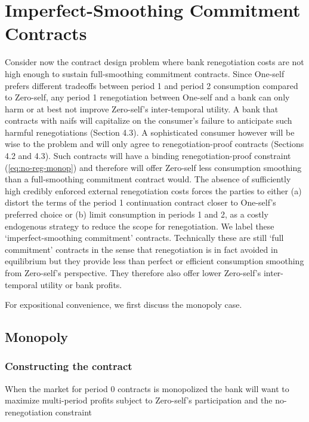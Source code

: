 \documentclass[11pt,english]{article}
\theoremstyle{plain}
\theoremstyle{definition}
\begin{document}
\section{Imperfect-Smoothing Commitment Contracts }

\label{sec:imperfectK}

Consider now the contract design problem where bank renegotiation
costs are not high enough to sustain full-smoothing commitment contracts.
Since One-self prefers different tradeoffs between period 1 and period
2 consumption compared to Zero-self, any period 1 renegotiation between
One-self and a bank can only harm \textendash{} or at best not improve
\textendash{} Zero-self's inter-temporal utility. A bank that contracts
with naifs will capitalize on the consumer's failure to anticipate
such harmful renegotiations (Section 4.3). A sophisticated consumer
however will be wise to the problem and will only agree to renegotiation-proof
contracts (Sections 4.2 and 4.3). Such contracts will have a binding
renegotiation-proof constraint (\ref{eq:no-reg-monop}) and therefore
will offer Zero-self less consumption smoothing than a full-smoothing
commitment contract would. The absence of sufficiently high credibly
enforced external renegotiation costs forces the parties to either
(a) distort the terms of the period 1 continuation contract closer
to One-self's preferred choice or (b) limit consumption in periods
1 and 2, as a costly endogenous strategy to reduce the scope for renegotiation.
We label these `imperfect-smoothing commitment' contracts. Technically
these are still `full commitment' contracts in the sense that renegotiation
is in fact avoided in equilibrium but they provide less than perfect
or efficient consumption smoothing from Zero-self's perspective. They
therefore also offer lower Zero-self's inter-temporal utility or bank
profits.

For expositional convenience, we first discuss the monopoly case.

\subsection{Monopoly}

\subsubsection{Constructing the contract}

When the market for period 0 contracts is monopolized the bank will
want to maximize multi-period profits subject to Zero-self's participation
and the no-renegotiation constraint
\end{document}
